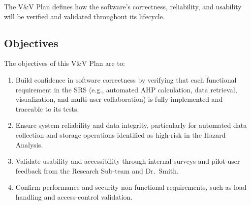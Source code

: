 \documentclass[12pt, titlepage]{article}
\begin{document}
The V\&V Plan defines how the software’s correctness, reliability, and usability
will be verified and validated throughout its lifecycle.

\subsection{Objectives}
\label{subsec:objectives}


The objectives of this V\&V Plan are to:

\begin{enumerate}
  \item Build confidence in software correctness by verifying that each
  functional requirement in the SRS (e.g., automated AHP calculation, data
  retrieval, visualization, and multi-user collaboration) is fully implemented
  and traceable to its tests.

  \item Ensure system reliability and data integrity, particularly for automated
  data collection and storage operations identified as high-risk in the Hazard
  Analysis.

  \item Validate usability and accessibility through internal surveys and
  pilot-user feedback from the Research Sub-team and Dr.~Smith.

  \item Confirm performance and security non-functional requirements, such as
  load handling and access-control validation.
\end{enumerate}
\end{document}
